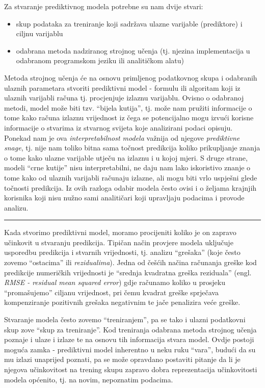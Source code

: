 \documentclass[]{book}
\providecommand{\tightlist}{%
  \setlength{\itemsep}{0pt}\setlength{\parskip}{0pt}}
\theoremstyle{definition}
\theoremstyle{definition}
\theoremstyle{definition}
\theoremstyle{remark}
\begin{document}
Za stvaranje prediktivnog modela potrebne su nam dvije stvari:

\begin{itemize}
\tightlist
\item
  skup podataka za treniranje koji sadržava ulazne varijable
  (prediktore) i ciljnu varijablu
\item
  odabrana metoda nadziranog strojnog učenja (tj. njezina implementacija
  u odabranom programskom jeziku ili analitičkom alatu)
\end{itemize}

Metoda strojnog učenja će na osnovu primljenog podatkovnog skupa i
odabranih ulaznih parametara stvoriti prediktivni model - formulu ili
algoritam koji iz ulaznih varijabli računa tj. procjenjuje izlaznu
varijablu. Ovisno o odabranoj metodi, model može biti tzv. ``bijela
kutija'', tj. može nam pružiti informacije o tome kako računa izlaznu
vrijednost iz čega se potencijalno mogu izvući korisne informacije o
stvarima iz stvarnog svijeta koje analizirani podaci opisuju. Ponekad
nam je ova \emph{interpretabilnost modela} važnija od njegove
\emph{prediktivne snage}, tj. nije nam toliko bitna sama točnost
predikcija koliko prikupljanje znanja o tome kako ulazne varijable
utječu na izlaznu i u kojoj mjeri. S druge strane, modeli ``crne
kutije'' nisu interpretabilni, ne daju nam lako iskoristivo znanje o
tome kako od ulaznih varijabli računaju izlazne, ali mogu biti vrlo
uspješni glede točnosti predikcija. Iz ovih razloga odabir modela često
ovisi i o željama krajnjih korisnika koji nisu nužno sami analitičari
koji upravljaju podacima i provode analizu.

\begin{center}\rule{0.5\linewidth}{\linethickness}\end{center}

Kada stvorimo prediktivni model, moramo procijeniti koliko je on zapravo
učinkovit u stvaranju predikcija. Tipičan način provjere modela
uključuje usporedbu predikcija i stvarnih vrijednosti, tj. analizu
``grešaka'' (koje često zovemo ``ostacima'' ili \emph{rezidualima}).
Jedna od češćih načina računanja greške kod predikcije numeričkih
vrijednosti je ``srednja kvadratna greška reziduala'' (engl. \emph{RMSE
- residual mean squared error}) gdje računamo koliko u prosjeku
``promašujemo'' ciljanu vrijednost, pri čemu kvadrat greške sprječava
kompenziranje pozitivnih grešaka negativnim te jače penalizira veće
greške.

Stvaranje modela često zovemo ``treniranjem'', pa se tako i ulazni
podatkovni skup zove ``skup za treniranje''. Kod treniranja odabrana
metoda strojnog učenja poznaje i ulaze i izlaze te na osnovu tih
informacija stvara model. Ovdje postoji moguća zamka - prediktivni model
inherentno u neku ruku ``vara'', budući da su mu izlazi unaprijed
poznati, pa se može opravdano postaviti pitanje da li je njegova
učinkovitost na trening skupu zapravo dobra reprezentacija učinkovitosti
modela općenito, tj. na novim, nepoznatim podacima.
\end{document}
